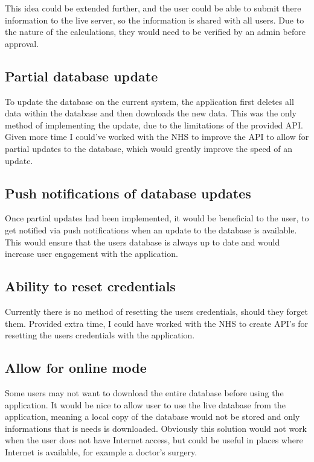 This idea could be extended further, and the user could be able to submit there information to the live server, so the information is shared with all users. Due to the nature of the calculations, they would need to be verified by an admin before approval.

\subsection{Partial database update}

To update the database on the current system, the application first deletes all data within the database and then downloads the new data. This was the only method of implementing the update, due to the limitations of the provided API. Given more time I could've worked with the NHS to improve the API to allow for partial updates to the database, which would greatly improve the speed of an update.

\subsection{Push notifications of database updates}

Once partial updates had been implemented, it would be beneficial to the user, to get notified via push notifications when an update to the database is available.  This would ensure that the users database is always up to date and would increase user engagement with the application.

\subsection{Ability to reset credentials}

Currently there is no method of resetting the users credentials, should they forget them. Provided extra time, I could have worked with the NHS to create API's for resetting the users credentials with the application.


\subsection{Allow for online mode}

Some users may not want to download the entire database before using the application. It would be nice to allow user to use the live database from the application, meaning a local copy of the database would not be stored and only informations that is needs is downloaded. Obviously this solution would not work when the user does not have Internet access, but could be useful in places where Internet is available, for example a doctor's surgery.
